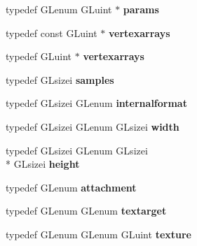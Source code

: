 \begin{DoxyCompactItemize}
\item 
\hypertarget{class_c_p_v_r_tgles2_ext_af94a02bc494e456a9d5941cb5b05b6a0}{typedef G\+Lenum G\+Luint $\ast$ {\bfseries params}}\label{class_c_p_v_r_tgles2_ext_af94a02bc494e456a9d5941cb5b05b6a0}

\item 
\hypertarget{class_c_p_v_r_tgles2_ext_afc28cb5dc5517d63bc02efa288195d03}{typedef const G\+Luint $\ast$ {\bfseries vertexarrays}}\label{class_c_p_v_r_tgles2_ext_afc28cb5dc5517d63bc02efa288195d03}

\item 
\hypertarget{class_c_p_v_r_tgles2_ext_a3bf443a5e2c094121f19f7b0125cf2c4}{typedef G\+Luint $\ast$ {\bfseries vertexarrays}}\label{class_c_p_v_r_tgles2_ext_a3bf443a5e2c094121f19f7b0125cf2c4}

\item 
\hypertarget{class_c_p_v_r_tgles2_ext_a3fd19d50f4e2565a44928dc3926d007d}{typedef G\+Lsizei {\bfseries samples}}\label{class_c_p_v_r_tgles2_ext_a3fd19d50f4e2565a44928dc3926d007d}

\item 
\hypertarget{class_c_p_v_r_tgles2_ext_a4e2aa37edfa184ddce76ec91ac5d573d}{typedef G\+Lsizei G\+Lenum {\bfseries internalformat}}\label{class_c_p_v_r_tgles2_ext_a4e2aa37edfa184ddce76ec91ac5d573d}

\item 
\hypertarget{class_c_p_v_r_tgles2_ext_a31126d8711023adaa65f5fc9b111d7a4}{typedef G\+Lsizei G\+Lenum G\+Lsizei {\bfseries width}}\label{class_c_p_v_r_tgles2_ext_a31126d8711023adaa65f5fc9b111d7a4}

\item 
\hypertarget{class_c_p_v_r_tgles2_ext_a9c120cee81d2beff2554730b22a36745}{typedef G\+Lsizei G\+Lenum G\+Lsizei \\*
G\+Lsizei {\bfseries height}}\label{class_c_p_v_r_tgles2_ext_a9c120cee81d2beff2554730b22a36745}

\item 
\hypertarget{class_c_p_v_r_tgles2_ext_a40c9fa283601f2120198a057c1e9853a}{typedef G\+Lenum {\bfseries attachment}}\label{class_c_p_v_r_tgles2_ext_a40c9fa283601f2120198a057c1e9853a}

\item 
\hypertarget{class_c_p_v_r_tgles2_ext_af3712168a47282bd3e31f9d85fdc892b}{typedef G\+Lenum G\+Lenum {\bfseries textarget}}\label{class_c_p_v_r_tgles2_ext_af3712168a47282bd3e31f9d85fdc892b}

\item 
\hypertarget{class_c_p_v_r_tgles2_ext_a84aa8a62de530408b333c31d1344841b}{typedef G\+Lenum G\+Lenum G\+Luint {\bfseries texture}}\label{class_c_p_v_r_tgles2_ext_a84aa8a62de530408b333c31d1344841b}


\end{DoxyCompactItemize}
